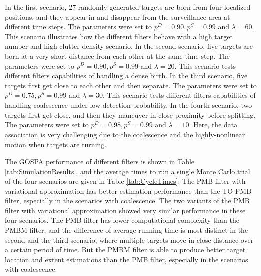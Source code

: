 \documentclass[journal]{IEEEtran}
\begin{document}
In the first scenario, 27 randomly generated targets are born from four localized positions, and they appear in and disappear from the surveillance area at different time steps. The parameters were set to $p^D = 0.90, p^S = 0.99$ and $ \lambda = 60$. This scenario illustrates how the different filters behave with a high target number and high clutter density scenario. In the second scenario, five targets are born at a very short distance from each other at the same time step. The parameters were set to $p^D = 0.90, p^S = 0.99$ and $ \lambda = 20$. This scenario tests different filters capabilities of handling a dense birth. In the third scenario, five targets first get close to each other and then separate. The parameters were set to $p^D = 0.75, p^S = 0.99$ and $ \lambda = 30$. This scenario tests different filters capabilities of handling coalescence under low detection probability. In the fourth scenario, two targets first get close, and then they maneuver in close proximity before splitting. The parameters were set to $p^D = 0.98, p^S = 0.99$ and $ \lambda = 10$. Here, the data association is very challenging due to the coalescence and the highly-nonlinear motion when targets are turning.


\begin{table}[!t]
\caption{Average time $[s]$ to run one full Monte Carlo simulation}
\label{tab:CycleTimes}
	\centering
\end{table}

The GOSPA performance of different filters is shown in Table \ref{tab:SimulationResults}, and the average times to run a single Monte Carlo trial of the four scenarios are given in Table \ref{tab:CycleTimes}. The PMB filter with variational approximation has better estimation performance than the TO-PMB filter, especially in the scenarios with coalescence. The two variants of the PMB filter with variational approximation showed very similar performance in these four scenarios. The PMB filter has lower computational complexity than the PMBM filter, and the difference of average running time is most distinct in the second and the third scenario, where multiple targets move in close distance over a certain period of time. But the PMBM filter is able to produce better target location and extent estimations than the PMB filter, especially in the scenarios with coalescence. 
\end{document}
